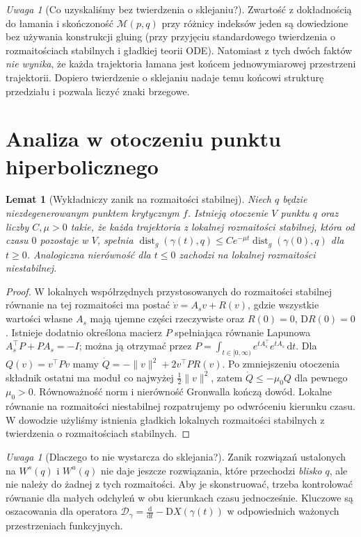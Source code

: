 \documentclass[11pt,a4paper,oneside]{report}
\newcommand{\D}{\mathrm D}
\newcommand{\dd}{\mathrm d}
\theoremstyle{plain}
\newtheorem{lemat}[twierdzenie]{Lemat}
\theoremstyle{definition}
\theoremstyle{remark}
\newtheorem{uwaga}[twierdzenie]{Uwaga}
\begin{document}
\begin{uwaga}[Co uzyskaliśmy bez twierdzenia o sklejaniu?]
Zwartość z dokładnością do łamania i skończoność
$\mathcal M(p,q)$ przy różnicy indeksów jeden są dowiedzione
bez używania konstrukcji gluing (przy przyjęciu
standardowego twierdzenia o rozmaitościach stabilnych
i gładkiej teorii ODE). Natomiast z tych dwóch
faktów \emph{nie wynika}, że każda trajektoria łamana
jest końcem jednowymiarowej przestrzeni trajektorii.
Dopiero twierdzenie o sklejaniu nadaje temu końcowi
strukturę przedziału i pozwala liczyć znaki brzegowe.
\end{uwaga}

\section{Analiza w otoczeniu punktu hiperbolicznego}
\begin{lemat}[Wykładniczy zanik na rozmaitości stabilnej]
\label{lem:morse-exponential-v11}
Niech $q$ będzie niezdegenerowanym punktem krytycznym $f$.
Istnieją otoczenie $V$ punktu $q$ oraz liczby $C,\mu>0$
takie, że każda trajektoria z lokalnej rozmaitości stabilnej,
która od czasu $0$ pozostaje w $V$, spełnia
$\operatorname{dist}_g(\gamma(t),q)\le
C e^{-\mu t}\operatorname{dist}_g(\gamma(0),q)$ dla $t\ge0$.
Analogiczna nierówność dla $t\le0$ zachodzi na lokalnej
rozmaitości niestabilnej.
\end{lemat}
\begin{proof}
W lokalnych współrzędnych przystosowanych do rozmaitości
stabilnej równanie na tej rozmaitości ma postać
$\dot v=A_sv+R(v)$, gdzie wszystkie wartości własne
$A_s$ mają ujemne części rzeczywiste oraz $R(0)=0$,
$\D R(0)=0$. Istnieje dodatnio określona macierz $P$
spełniająca równanie Lapunowa
$A_s^\top P+PA_s=-I$; można ją otrzymać przez
$P=\int_{t\in[0,\infty)}e^{tA_s^\top}e^{tA_s}\,\dd t$.
Dla $Q(v)=v^\top Pv$ mamy
$\dot Q=-\|v\|^2+2v^\top PR(v)$.
Po zmniejszeniu otoczenia składnik ostatni ma moduł
co najwyżej $\frac12\|v\|^2$, zatem
$\dot Q\le-\mu_0 Q$ dla pewnego $\mu_0>0$.
Równoważność norm i nierówność Gronwalla kończą dowód.
Lokalne równanie na rozmaitości niestabilnej rozpatrujemy
po odwróceniu kierunku czasu. W dowodzie użyliśmy istnienia
gładkich lokalnych rozmaitości stabilnych z twierdzenia
o rozmaitościach stabilnych.
\end{proof}

\begin{uwaga}[Dlaczego to nie wystarcza do sklejania?]
Zanik rozwiązań ustalonych na $W^s(q)$ i $W^u(q)$ nie daje
jeszcze rozwiązania, które przechodzi \emph{blisko} $q$,
ale nie należy do żadnej z tych rozmaitości. Aby je
skonstruować, trzeba kontrolować równanie dla małych
odchyleń w obu kierunkach czasu jednocześnie.
Kluczowe są oszacowania dla operatora
$\mathcal D_\gamma=\tfrac{\dd}{\dd t}-\D X(\gamma(t))$
w odpowiednich ważonych przestrzeniach funkcyjnych.
\end{uwaga}
\end{document}
